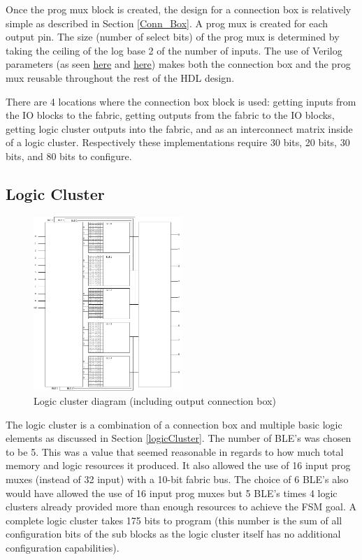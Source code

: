 \documentclass[12pt]{article}
\begin{document}
Once the prog mux block is created, the design for a connection box is relatively simple
as described in Section \ref{Conn_Box}. A prog mux is created for each output pin. The
size (number of select bits) of the prog mux is determined by taking the ceiling of
the log base 2 of the number of inputs.
The use of Verilog parameters (as seen
\href{https://github.com/JosephPrachar/fpga/blob/master/src/prog_mux16.v}{here} and
\href{https://github.com/JosephPrachar/fpga/blob/master/src/conn_box.v}{here})
makes both the connection box and the prog mux reusable
throughout the rest of the HDL design.

There are 4 locations where the connection box block is used: getting inputs from the
IO blocks to the fabric, getting outputs from the fabric to the IO blocks, getting
logic cluster outputs into the fabric, and as an interconnect matrix inside of a logic
cluster. Respectively these implementations require 30 bits, 20 bits, 30 bits, and 80 bits
to configure.

\subsection{Logic Cluster}

\begin{figure}[H]
    \centering
    \includegraphics[width=0.5\textwidth]{LogicCluster}
    \caption{Logic cluster diagram (including output connection box)}
    \label{fig:logic_cluster}
\end{figure}

The logic cluster is a combination of a connection box and multiple basic logic elements
as discussed in Section \ref{logicCluster}. The number of BLE's was chosen to be 5. This
was a value that seemed reasonable in regards to how much total memory and logic resources
 it produced. It also allowed the use of 16 input prog muxes (instead of 32 input) with a
10-bit fabric bus. The choice of 6 BLE's also would have allowed the use of 16 input prog muxes but
5 BLE's times 4 logic clusters already provided more than enough resources to achieve the
FSM goal. A complete logic cluster takes 175 bits to program (this number is the sum of all
configuration bits of the sub blocks as the logic cluster itself has no additional
configuration capabilities).
\end{document}
